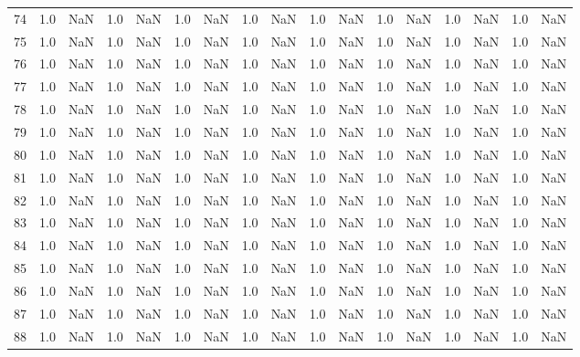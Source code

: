\begin{tabular}{lrrrrrrrrrrrrrrrr}
     74 &  1.0 & NaN &   1.0 &   NaN &   1.0 &   NaN &   1.0 &   NaN &   1.0 &   NaN &   1.0 &   NaN &   1.0 &   NaN &   1.0 &   NaN \\
     75 &  1.0 & NaN &   1.0 &   NaN &   1.0 &   NaN &   1.0 &   NaN &   1.0 &   NaN &   1.0 &   NaN &   1.0 &   NaN &   1.0 &   NaN \\
     76 &  1.0 & NaN &   1.0 &   NaN &   1.0 &   NaN &   1.0 &   NaN &   1.0 &   NaN &   1.0 &   NaN &   1.0 &   NaN &   1.0 &   NaN \\
     77 &  1.0 & NaN &   1.0 &   NaN &   1.0 &   NaN &   1.0 &   NaN &   1.0 &   NaN &   1.0 &   NaN &   1.0 &   NaN &   1.0 &   NaN \\
     78 &  1.0 & NaN &   1.0 &   NaN &   1.0 &   NaN &   1.0 &   NaN &   1.0 &   NaN &   1.0 &   NaN &   1.0 &   NaN &   1.0 &   NaN \\
     79 &  1.0 & NaN &   1.0 &   NaN &   1.0 &   NaN &   1.0 &   NaN &   1.0 &   NaN &   1.0 &   NaN &   1.0 &   NaN &   1.0 &   NaN \\
     80 &  1.0 & NaN &   1.0 &   NaN &   1.0 &   NaN &   1.0 &   NaN &   1.0 &   NaN &   1.0 &   NaN &   1.0 &   NaN &   1.0 &   NaN \\
     81 &  1.0 & NaN &   1.0 &   NaN &   1.0 &   NaN &   1.0 &   NaN &   1.0 &   NaN &   1.0 &   NaN &   1.0 &   NaN &   1.0 &   NaN \\
     82 &  1.0 & NaN &   1.0 &   NaN &   1.0 &   NaN &   1.0 &   NaN &   1.0 &   NaN &   1.0 &   NaN &   1.0 &   NaN &   1.0 &   NaN \\
     83 &  1.0 & NaN &   1.0 &   NaN &   1.0 &   NaN &   1.0 &   NaN &   1.0 &   NaN &   1.0 &   NaN &   1.0 &   NaN &   1.0 &   NaN \\
     84 &  1.0 & NaN &   1.0 &   NaN &   1.0 &   NaN &   1.0 &   NaN &   1.0 &   NaN &   1.0 &   NaN &   1.0 &   NaN &   1.0 &   NaN \\
     85 &  1.0 & NaN &   1.0 &   NaN &   1.0 &   NaN &   1.0 &   NaN &   1.0 &   NaN &   1.0 &   NaN &   1.0 &   NaN &   1.0 &   NaN \\
     86 &  1.0 & NaN &   1.0 &   NaN &   1.0 &   NaN &   1.0 &   NaN &   1.0 &   NaN &   1.0 &   NaN &   1.0 &   NaN &   1.0 &   NaN \\
     87 &  1.0 & NaN &   1.0 &   NaN &   1.0 &   NaN &   1.0 &   NaN &   1.0 &   NaN &   1.0 &   NaN &   1.0 &   NaN &   1.0 &   NaN \\
     88 &  1.0 & NaN &   1.0 &   NaN &   1.0 &   NaN &   1.0 &   NaN &   1.0 &   NaN &   1.0 &   NaN &   1.0 &   NaN &   1.0 &   NaN \\

\end{tabular}
